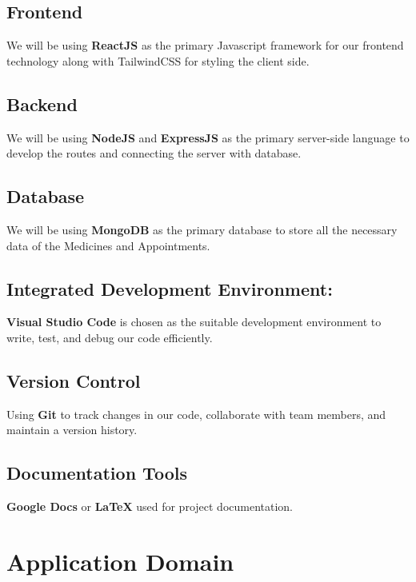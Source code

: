 \documentclass[11.5pt]{article}
\begin{document}
	
	\subsection{Frontend}
	We will be using \textbf{ReactJS} as the primary Javascript framework for our frontend technology along with TailwindCSS for styling the client side.
	
	\subsection{Backend}
	We will be using \textbf{NodeJS} and \textbf{ExpressJS} as the primary server-side language to develop the routes and connecting the server with database.
	
	\subsection{Database}
	We will be using \textbf{MongoDB} as the primary database to store all the necessary data of the Medicines and Appointments.
	
	\subsection{Integrated Development Environment:}
	\textbf{Visual Studio Code} is chosen as the suitable development environment to write, test, and debug our code efficiently.
	
	\subsection{Version Control}
	Using \textbf{Git} to track changes in our code, collaborate with team members, and maintain a version history.
	
	\subsection{Documentation Tools}
	\textbf{Google Docs} or \textbf {LaTeX}  used for project documentation.
	
	
	
	
	\section{Application Domain}
	
\end{document}
